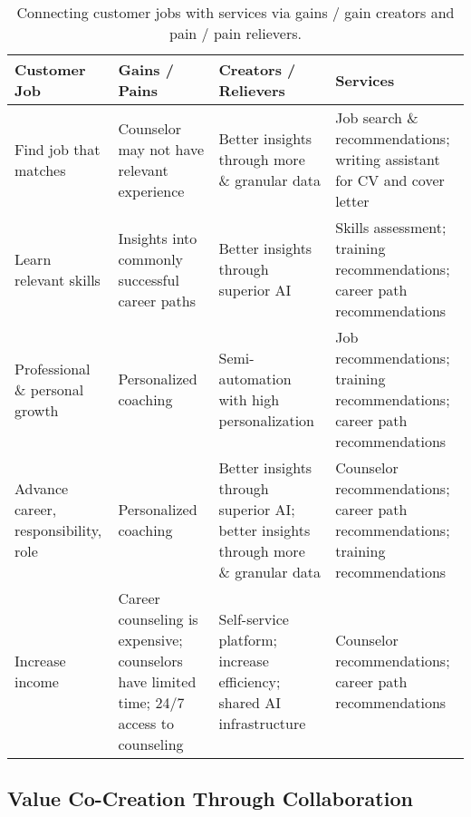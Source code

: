 \begin{table}[htb]
    \caption{
        Connecting customer jobs with services via gains / gain creators and pain / pain relievers.
    }
    \label{tab:vpc}

    \tiny
    \renewcommand{\arraystretch}{1.1}
    \small\centering
    \setlength\tabcolsep{8pt}
    \begin{tabularx}{\linewidth}{m m m m}
        \toprule
        \textbf{Customer Job} & \textbf{Gains / Pains} & \textbf{Creators / Relievers} & \textbf{Services} \\
        \toprule

        Find job that matches &
            Counselor may not have relevant experience &
            Better insights through more \& granular data &
            Job search \& recommendations; writing assistant for CV and cover letter\\ 
        \midrule
        
        Learn relevant skills &
            Insights into commonly successful career paths &
            Better insights through superior AI &
            Skills assessment; training recommendations; career path recommendations\\ 
        \midrule

        Professional \& personal growth &
            Personalized coaching &
            Semi-automation with high personalization &
            Job recommendations; training recommendations; career path recommendations\\ 
        \midrule

        Advance career, responsibility, role &
            Personalized coaching &
            Better insights through superior AI; better insights through more \& granular data&
            Counselor recommendations; career path recommendations; training recommendations \\ 
        \midrule

        Increase income &
            Career counseling is expensive; counselors have limited time; 24/7 access to counseling &
            Self-service platform; increase efficiency; shared AI infrastructure &
            Counselor recommendations; career path recommendations \\ 
        \bottomrule
    \end{tabularx}
\end{table}

\subsection{Value Co-Creation Through Collaboration}


